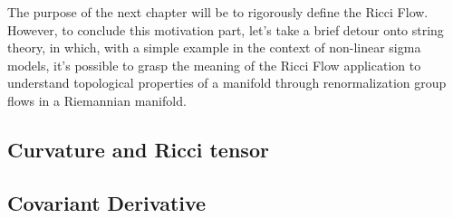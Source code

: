 The purpose of the next chapter will be to rigorously define the Ricci Flow. However, to conclude this motivation part, let's take a brief detour onto string theory, in which, with a simple example in the context of non-linear sigma models, it's possible to grasp the meaning of the Ricci Flow application to understand topological properties of a manifold through renormalization group flows in a Riemannian manifold.

\subsection{Curvature and Ricci tensor}
\subsection{Covariant Derivative}